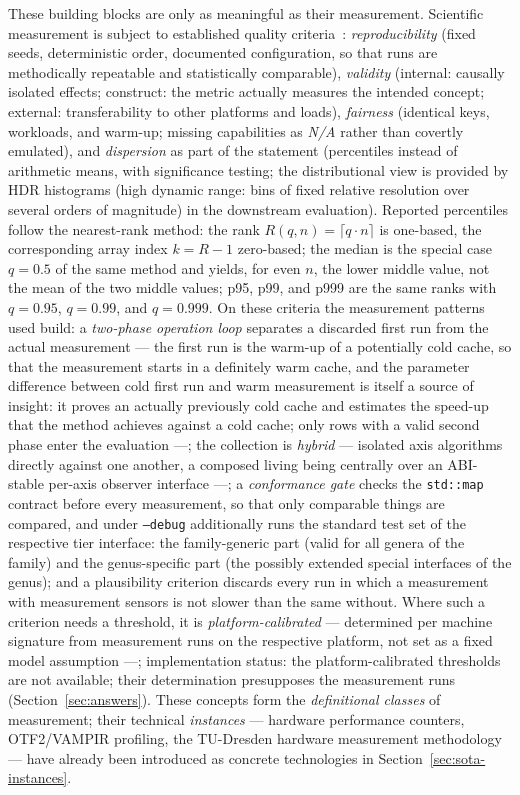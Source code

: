 \begin{nurlang}
These building blocks are only as meaningful as their measurement. Scientific measurement is subject to
established quality criteria~\cite{hoefler2015benchmarking}: \emph{reproducibility} (fixed seeds,
deterministic order, documented configuration, so that runs are methodically repeatable and
statistically comparable), \emph{validity} (internal: causally isolated effects; construct: the metric
actually measures the intended concept; external: transferability to other platforms and loads),
\emph{fairness} (identical keys, workloads, and
warm-up; missing capabilities as \emph{N/A} rather than covertly emulated), and \emph{dispersion} as part of the
statement (percentiles instead of arithmetic means, with significance testing; the distributional view is provided by
HDR histograms (high dynamic range: bins of fixed relative resolution over several orders of
magnitude) in the downstream evaluation). Reported percentiles follow the
nearest-rank method: the rank $R(q,n)=\lceil q\cdot n\rceil$ is one-based, the corresponding
array index $k=R-1$ zero-based; the median is the special case $q=0.5$ of the same method and
yields, for even $n$, the lower middle value, not the mean of the two middle values; p95, p99, and
p999 are the same ranks with $q=0.95$, $q=0.99$, and $q=0.999$. On these
criteria the measurement patterns used build: a \emph{two-phase operation loop} separates a
discarded first run from the actual measurement --- the first run is the warm-up of a potentially
cold cache, so that the measurement starts in a definitely warm cache, and the parameter difference
between cold first run and warm measurement is itself a source of insight: it proves an actually
previously cold cache and estimates the speed-up that the method achieves against a cold cache;
only rows with a valid second phase enter the evaluation ---; the collection is
\emph{hybrid} --- isolated axis algorithms directly against one another, a composed living being
centrally over an ABI-stable per-axis observer interface ---; a \emph{conformance gate}
checks the \texttt{std::map} contract before every measurement, so that only comparable things are compared,
and under \texttt{--debug} additionally runs the standard test set of the respective tier interface: the
family-generic part (valid for all genera of the family) and the genus-specific part (the possibly
extended special interfaces of the genus); and a
plausibility criterion discards every run in which a measurement with measurement sensors is not slower than
the same without. Where such a criterion needs a threshold, it is \emph{platform-calibrated} ---
determined per machine signature from measurement runs on the respective platform, not set as a fixed
model assumption ---; implementation status: the platform-calibrated thresholds are not available; their
determination presupposes the measurement runs (Section~\ref{sec:answers}). These concepts form the
\emph{definitional classes} of measurement; their technical \emph{instances} --- hardware performance counters,
OTF2/VAMPIR profiling, the TU-Dresden hardware measurement methodology --- have already been introduced as
concrete technologies in Section~\ref{sec:sota-instances}.
\end{nurlang}
